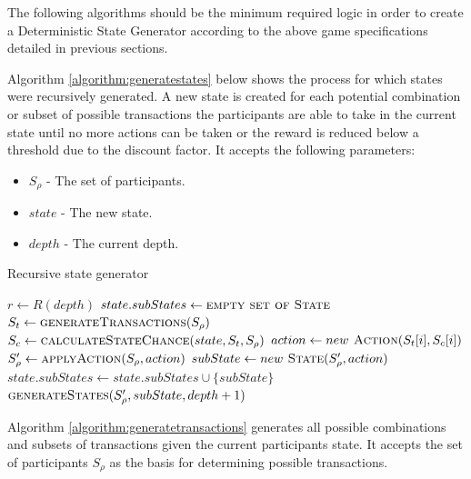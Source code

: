 The following algorithms should be the minimum required logic in order to create a Deterministic State Generator according to the above game specifications detailed in previous sections.

Algorithm \ref{algorithm:generatestates} below shows the process for which states were recursively generated. A new state is created for each potential combination or subset of possible transactions the participants are able to take in the current state until no more actions can be taken or the reward is reduced below a threshold due to the discount factor. It accepts the following parameters:

\begin{itemize}
    \item $S_\rho$ - The set of participants.
    \item $state$ - The new state.
    \item $depth$ - The current depth.
\end{itemize}

\begin{algorithm}[H]
\caption{Recursive state generator}
\label{algorithm:generatestates}
\begin{algorithmic}[1]
    \State $r \gets R(depth)$ 
        \State \Return
    \EndIf
    \State $state.subStates \gets \textsc{empty set of State}$
    \State $S_t \gets \textsc{generateTransactions}(S_\rho)$ 
    \State $S_c \gets \textsc{calculateStateChance}(state, S_t, S_\rho)$ 
    \For{$i \in [0, S_t.length)$}
        \State $action \gets new \textsc{ Action}(S_t[i], S_c[i])$
        \State $S_\rho' \gets \textsc{applyAction}(S_\rho, action)$ 
        \State $subState \gets new \textsc{ State}(S_\rho', action)$
        \State $state.subStates \gets state.subStates \cup \{subState\}$
        \State $\textsc{generateStates}(S_\rho', subState, depth + 1)$
    \EndFor
\EndProcedure
\end{algorithmic}
\end{algorithm}

Algorithm \ref{algorithm:generatetransactions} generates all possible combinations and subsets of transactions given the current participants state. It accepts the set of participants $S_\rho$ as the basis for determining possible transactions.

